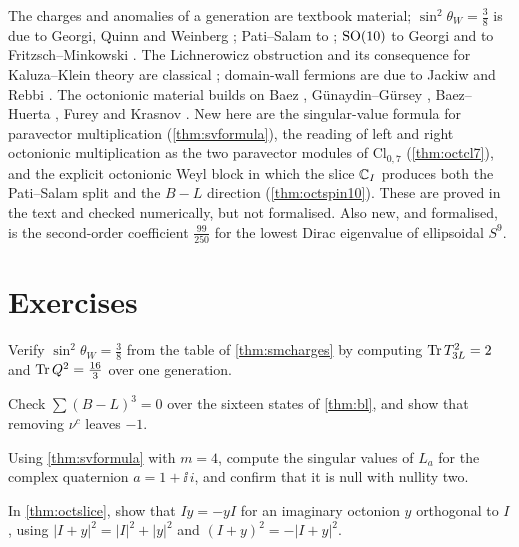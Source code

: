 \begin{litbox}
The charges and anomalies of a generation are textbook material; $\sin^2\theta_W=\frac38$ is due to Georgi, Quinn and Weinberg \cite{GeorgiGlashow1974}; Pati--Salam to \cite{PatiSalam1974}; $\mathrm{SO}(10)$ to Georgi and to Fritzsch--Minkowski \cite{GeorgiSO10,FritzschMinkowski1975}. The Lichnerowicz obstruction and its consequence for Kaluza--Klein theory are classical \cite{Witten1981}; domain-wall fermions are due to Jackiw and Rebbi \cite{JackiwRebbi1976}. The octonionic material builds on Baez \cite{Baez2002}, G\"unaydin--G\"ursey \cite{GunaydinGursey1973}, Baez--Huerta \cite{BaezHuerta2010}, Furey \cite{Furey2016} and Krasnov \cite{Krasnov2021}. New here are the singular-value formula for paravector multiplication (\cref{thm:svformula}), the reading of left and right octonionic multiplication as the two paravector modules of $\mathrm{Cl}_{0,7}$ (\cref{thm:octcl7}), and the explicit octonionic Weyl block in which the slice $\mathbb{C}_I$ produces both the Pati--Salam split and the $B-L$ direction (\cref{thm:octspin10}). These are proved in the text and checked numerically, but not formalised. Also new, and formalised, is the second-order coefficient $\frac{99}{250}$ for the lowest Dirac eigenvalue of ellipsoidal $S^9$.
\end{litbox}

\section*{Exercises}
\begin{exercise}
Verify $\sin^2\theta_W=\frac38$ from the table of \cref{thm:smcharges} by computing $\operatorname{Tr} T_{3L}^2=2$ and $\operatorname{Tr} Q^2=\frac{16}3$ over one generation.
\end{exercise}
\begin{exercise}
Check $\sum(B-L)^3=0$ over the sixteen states of \cref{thm:bl}, and show that removing $\nu^c$ leaves $-1$.
\end{exercise}
\begin{exercise}
Using \cref{thm:svformula} with $m=4$, compute the singular values of $L_a$ for the complex quaternion $a=1+\ii\,i$, and confirm that it is null with nullity two.
\end{exercise}
\begin{exercise}
In \cref{thm:octslice}, show that $Iy=-yI$ for an imaginary octonion $y$ orthogonal to $I$, using $|I+y|^2=|I|^2+|y|^2$ and $(I+y)^2=-|I+y|^2$.
\end{exercise}

